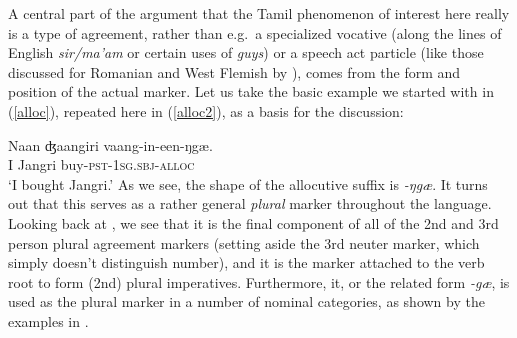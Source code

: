 \documentclass[output=paper, modfonts, nonflat]{langsci/langscibook}
\begin{document}
A central part of the argument that the Tamil phenomenon of interest
here really is a type of agreement, rather than e.g.\ a specialized
vocative (along the lines of English \textit{sir/ma'am} or certain
uses of \textit{guys}) or a speech act particle (like those discussed
for Romanian and West Flemish by \citealp{haegemanhill:2011}), comes
from the form and position of the actual marker. Let us take the basic
example we started with in (\ref{alloc}), repeated here in
(\ref{alloc2}), as a basis for the discussion:

\ea\label{alloc2}
\gll Naan ʤaangiri vaang-in-een-ŋgæ.\\
I Jangri buy-\textsc{pst}{}-1\textsc{sg}.\textsc{sbj}-\textsc{alloc}\\
\glt `I bought Jangri.'
\z
%
As we see, the shape of the allocutive suffix is \textit{-ŋgæ}. It
turns out that this serves as a rather general \emph{plural} marker
throughout the language. Looking back at , we
see that it is the final component of all of the 2nd and 3rd person
plural agreement markers (setting aside the 3rd neuter marker, which
simply doesn't distinguish number), and it is the marker attached to
the verb root to form (2nd) plural imperatives. Furthermore, it, or
the related form \textit{-gæ}, is used as the plural marker in a
number of nominal categories, as shown by the examples in .
\end{document}
